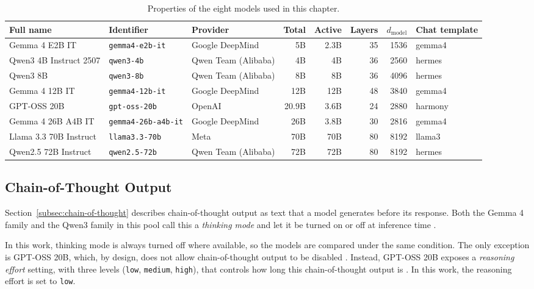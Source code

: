 \begin{table}[htbp]
    \centering
    \footnotesize
    \setlength{\tabcolsep}{4pt}
    \begin{tabular}{lllrrrrl}
        \toprule
        Full name & Identifier & Provider & Total & Active & Layers & $d_{\mathrm{model}}$ & Chat template \\
        \midrule
        Gemma 4 E2B IT & \texttt{gemma4-e2b-it} & Google DeepMind & 5B & 2.3B & 35 & 1536 & gemma4 \\
        Qwen3 4B Instruct 2507 & \texttt{qwen3-4b} & Qwen Team (Alibaba) & 4B & 4B & 36 & 2560 & hermes \\
        Qwen3 8B & \texttt{qwen3-8b} & Qwen Team (Alibaba) & 8B & 8B & 36 & 4096 & hermes \\
        Gemma 4 12B IT & \texttt{gemma4-12b-it} & Google DeepMind & 12B & 12B & 48 & 3840 & gemma4 \\
        GPT-OSS 20B & \texttt{gpt-oss-20b} & OpenAI & 20.9B & 3.6B & 24 & 2880 & harmony \\
        Gemma 4 26B A4B IT & \texttt{gemma4-26b-a4b-it} & Google DeepMind & 26B & 3.8B & 30 & 2816 & gemma4 \\
        Llama 3.3 70B Instruct & \texttt{llama3.3-70b} & Meta & 70B & 70B & 80 & 8192 & llama3 \\
        Qwen2.5 72B Instruct & \texttt{qwen2.5-72b} & Qwen Team (Alibaba) & 72B & 72B & 80 & 8192 & hermes \\
        \bottomrule
    \end{tabular}
    \caption[Properties of the eight models used in this chapter]{Properties of the eight models used in this chapter.}
    \label{tab:model-properties}
\end{table}

\subsection{Chain-of-Thought Output}
\label{subsec:ch7-reasoning-traces}

Section~\ref{subsec:chain-of-thought} describes chain-of-thought output as text that a model generates before its response. Both the Gemma 4 family and the Qwen3 family in this pool call this a \emph{thinking mode} and let it be turned on or off at inference time \cite{teamGemma4Technical2026, yangQwen3TechnicalReport2025}.

In this work, thinking mode is always turned off where available, so the models are compared under the same condition. The only exception is GPT-OSS 20B, which, by design, does not allow chain-of-thought output to be disabled \cite{openaiGptoss120bGptoss20bModel2025}. Instead, GPT-OSS 20B exposes a \emph{reasoning effort} setting, with three levels (\texttt{low}, \texttt{medium}, \texttt{high}), that controls how long this chain-of-thought output is \cite{openaiGptoss120bGptoss20bModel2025}. In this work, the reasoning effort is set to \texttt{low}.
